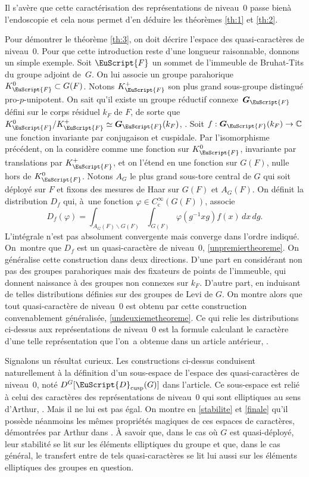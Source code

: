 \documentclass[JEP,XML,SOM,Unicode,francais]{cedram}
\let\mathcal \EuScript
\let\oldS\S
\renewcommand{\S}{\oldS\,}
\newcommand{\rc}{\mathrm{c}}
\newcommand{\cusp}{\mathrm{cusp}}
\newcommand{\bG}{\boldsymbol{G}}
\newcommand{\cD}{\mathcal{D}}
\newcommand{\cF}{\mathcal{F}}
\newcommand{\CC}{\mathbb{C}}
\theoremstyle{plain}
\theoremstyle{definition}
\begin{document}
Il s'avère que cette caractérisation des représentations de niveau~$0$ \og passe bien\fg à l'endoscopie et cela nous permet d'en déduire les théorèmes \ref{th:1} et \ref{th:2}.

Pour démontrer le théorème \ref{th:3}, on doit décrire l'espace des quasi-caractères de niveau~$0$. Pour que cette introduction reste d'une longueur raisonnable, donnons un simple exemple. Soit $\cF$ un sommet de l'immeuble de Bruhat-Tits du groupe adjoint de~$G$. On lui associe un groupe parahorique $K_{\cF}^0\subset G(F)$. Notons $K_{\cF}^+$ son plus grand sous-groupe distingué pro-$p$-unipotent. On sait qu'il existe un groupe réductif connexe~$\bG_{\cF}$ défini sur le corps résiduel $k_{F}$ de $F$, de sorte que $K_{\cF}^0/K_{\cF}^+\simeq \bG_{\cF}(k_{F})$, \cf \cite[\S3.4]{T}. Soit $f:\bG_{\cF}(k_{F})\to \CC$ une fonction invariante par conjugaison et cuspidale. Par l'isomorphisme précédent, on la considère comme une fonction sur $K_{\cF}^0$, invariante par translations par $K_{\cF}^+$, et on l'étend en une fonction sur $G(F)$, nulle hors de $K_{\cF}^0$. Notons $A_{G}$ le plus grand sous-tore central de $G$ qui soit déployé sur $F$ et fixons des mesures de Haar sur $G(F)$ et $A_{G}(F)$. On définit la distribution $D_{f}$ qui, à~une fonction $\varphi\in C_{\rc}^{\infty}(G(F))$, associe\vspace*{-3pt}
\[
D_{f}(\varphi)=\int_{A_{G}(F)\backslash G(F)}\int_{G(F)}\varphi(g^{-1}xg)f(x)\,dx\,dg.
\]
L'intégrale n'est pas absolument convergente mais converge dans l'ordre indiqué. On~montre que $D_{f}$ est un quasi-caractère de niveau~$0$, \cf \ref{unpremiertheoreme}. On généralise cette construction dans deux directions. D'une part en considérant non pas des groupes parahoriques mais des fixateurs de points de l'immeuble, qui donnent naissance à des groupes non connexes sur $k_{F}$. D'autre part, en induisant de telles distributions définies sur des groupes de Levi de $G$. On montre alors que tout quasi-caractère de niveau~$0$ est obtenu par cette construction convenablement généralisée, \cf \ref{undeuxiemetheoreme}. Ce qui relie les distributions ci-dessus aux représentations de niveau~$0$ est la formule calculant le carac\-tère d'une telle représentation que l'on~a obtenue dans un article antérieur, \cf \cite{W2}.

Signalons un résultat curieux. Les constructions ci-dessus conduisent naturellement à la définition d'un sous-espace de l'espace des quasi-caractères de niveau~$0$, noté $D^G[\cD_{\cusp}(G)]$ dans l'article. Ce sous-espace est relié à celui des caractères des représentations de niveau~$0$ qui sont elliptiques au sens d'Arthur, \cf \cite{A2}. Mais il ne lui est pas égal. On montre en \ref{stabilite} et \ref{finale} qu'il possède néanmoins les mêmes propriétés magiques de ces espaces de caractères, démontrées par Arthur dans \cite{A3}. À savoir que, dans le cas où $G$ est quasi-déployé, leur stabilité se lit sur les éléments elliptiques du groupe et que, dans le cas général, le transfert entre de tels quasi-caractères se lit lui aussi sur les éléments elliptiques des groupes en question.
\end{document}
